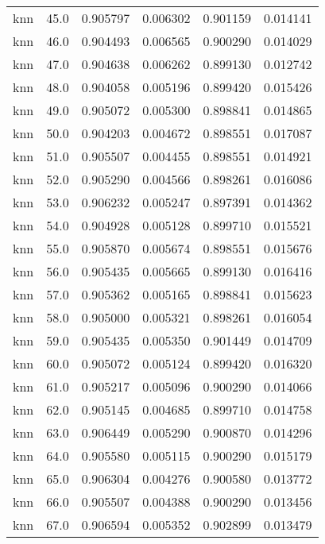 \begin{tabular}{lrrrrr}
     knn &       45.0 &    0.905797 &   0.006302 &   0.901159 &  0.014141 \\
     knn &       46.0 &    0.904493 &   0.006565 &   0.900290 &  0.014029 \\
     knn &       47.0 &    0.904638 &   0.006262 &   0.899130 &  0.012742 \\
     knn &       48.0 &    0.904058 &   0.005196 &   0.899420 &  0.015426 \\
     knn &       49.0 &    0.905072 &   0.005300 &   0.898841 &  0.014865 \\
     knn &       50.0 &    0.904203 &   0.004672 &   0.898551 &  0.017087 \\
     knn &       51.0 &    0.905507 &   0.004455 &   0.898551 &  0.014921 \\
     knn &       52.0 &    0.905290 &   0.004566 &   0.898261 &  0.016086 \\
     knn &       53.0 &    0.906232 &   0.005247 &   0.897391 &  0.014362 \\
     knn &       54.0 &    0.904928 &   0.005128 &   0.899710 &  0.015521 \\
     knn &       55.0 &    0.905870 &   0.005674 &   0.898551 &  0.015676 \\
     knn &       56.0 &    0.905435 &   0.005665 &   0.899130 &  0.016416 \\
     knn &       57.0 &    0.905362 &   0.005165 &   0.898841 &  0.015623 \\
     knn &       58.0 &    0.905000 &   0.005321 &   0.898261 &  0.016054 \\
     knn &       59.0 &    0.905435 &   0.005350 &   0.901449 &  0.014709 \\
     knn &       60.0 &    0.905072 &   0.005124 &   0.899420 &  0.016320 \\
     knn &       61.0 &    0.905217 &   0.005096 &   0.900290 &  0.014066 \\
     knn &       62.0 &    0.905145 &   0.004685 &   0.899710 &  0.014758 \\
     knn &       63.0 &    0.906449 &   0.005290 &   0.900870 &  0.014296 \\
     knn &       64.0 &    0.905580 &   0.005115 &   0.900290 &  0.015179 \\
     knn &       65.0 &    0.906304 &   0.004276 &   0.900580 &  0.013772 \\
     knn &       66.0 &    0.905507 &   0.004388 &   0.900290 &  0.013456 \\
     knn &       67.0 &    0.906594 &   0.005352 &   0.902899 &  0.013479 \\

\end{tabular}
